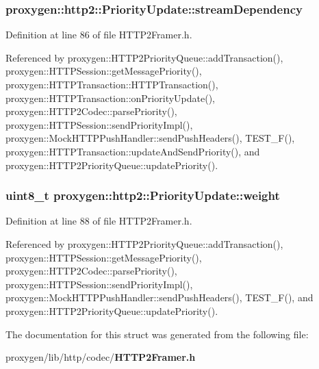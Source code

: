 \subsubsection[{stream\+Dependency}]{ proxygen\+::http2\+::\+Priority\+Update\+::stream\+Dependency}\label{structproxygen_1_1http2_1_1PriorityUpdate_a679735d9727d4589b1b12fd3a2f3d8d6}


Definition at line 86 of file H\+T\+T\+P2\+Framer.\+h.



Referenced by proxygen\+::\+H\+T\+T\+P2\+Priority\+Queue\+::add\+Transaction(), proxygen\+::\+H\+T\+T\+P\+Session\+::get\+Message\+Priority(), proxygen\+::\+H\+T\+T\+P\+Transaction\+::\+H\+T\+T\+P\+Transaction(), proxygen\+::\+H\+T\+T\+P\+Transaction\+::on\+Priority\+Update(), proxygen\+::\+H\+T\+T\+P2\+Codec\+::parse\+Priority(), proxygen\+::\+H\+T\+T\+P\+Session\+::send\+Priority\+Impl(), proxygen\+::\+Mock\+H\+T\+T\+P\+Push\+Handler\+::send\+Push\+Headers(), T\+E\+S\+T\+\_\+\+F(), proxygen\+::\+H\+T\+T\+P\+Transaction\+::update\+And\+Send\+Priority(), and proxygen\+::\+H\+T\+T\+P2\+Priority\+Queue\+::update\+Priority().

\subsubsection[{weight}]{\setlength{\rightskip}{0pt plus 5cm}uint8\+\_\+t proxygen\+::http2\+::\+Priority\+Update\+::weight}\label{structproxygen_1_1http2_1_1PriorityUpdate_a00aa8f514795cffb604c33eb49c0fd09}


Definition at line 88 of file H\+T\+T\+P2\+Framer.\+h.



Referenced by proxygen\+::\+H\+T\+T\+P2\+Priority\+Queue\+::add\+Transaction(), proxygen\+::\+H\+T\+T\+P\+Session\+::get\+Message\+Priority(), proxygen\+::\+H\+T\+T\+P2\+Codec\+::parse\+Priority(), proxygen\+::\+H\+T\+T\+P\+Session\+::send\+Priority\+Impl(), proxygen\+::\+Mock\+H\+T\+T\+P\+Push\+Handler\+::send\+Push\+Headers(), T\+E\+S\+T\+\_\+\+F(), and proxygen\+::\+H\+T\+T\+P2\+Priority\+Queue\+::update\+Priority().



The documentation for this struct was generated from the following file\+:\begin{DoxyCompactItemize}
\item 
proxygen/lib/http/codec/{\bf H\+T\+T\+P2\+Framer.\+h}\end{DoxyCompactItemize}
